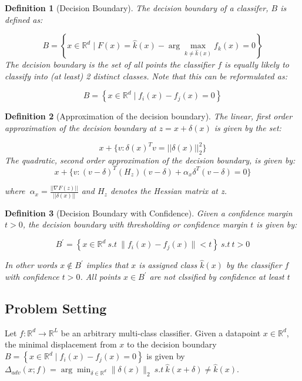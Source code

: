\documentclass[a4paper,singlecolumn,12pt]{article}
\newtheorem{definition}{Definition}[subsection]
\begin{document}
\begin{definition}[Decision Boundary]
The decision boundary of a classifer, $ B$ is defined as:

$$ B=\left\{x \in \mathbb{R}^{d} \mid F(x)=\hat{k}(x)-\arg \max _{k \neq \hat{k}(x)} f_{k}(x) = 0\right\}$$
The decision boundary is the set of all points the classifier $f$ is equally likely to classify into (at least) 2 distinct classes. Note that this can be reformulated as:

$$ B=\left\{x \in \mathbb{R}^{d} \mid f_{i}(x)-f_{j}(x)=0\right\}$$ 
\end{definition}

\begin{definition}[Approximation of the decision boundary]
The linear, first order approximation of the decision boundary at ${z}={x}+{\delta(x)}$ is given by the set:

$${x}+\{{v}:{{\delta(x)}^{T}v}=||{\delta(x)}||^2_2\}$$
The quadratic, second order approximation of the decision boundary, is given by:
$${x}+\{{v}: ({v-\delta})^{T}(H_{{z}})({v-\delta})+\alpha_{x}{\delta}^{T}({v-\delta})= 0\} $$

where $\ \alpha_x = \frac{||\nabla F({z})||}{||{\delta(x)}||}$ and $H_{z}$ denotes the Hessian matrix at z.

\end{definition}

\begin{definition}[Decision Boundary with Confidence]
Given a confidence margin $t > 0$, the decision boundary with thresholding or confidence margin $t$ is given by:

$$B^{\prime}=\left\{x \in \mathbb{R}^{d} \ s.t \ \|f_{i}(x)-f_{j}(x)\|<t\right\} \ s.t \ t > 0 $$

In other words $x \notin B^{\prime} $ implies that $x$ is assigned class $\hat{k}(x)$ by the classifier $f$ with confidence $t > 0$. All points $x \in B^{\prime}$ are not clssified by confidence at least $t$
\end{definition}



\subsection{Problem Setting}\label{problem_statement}
\par
Let $f: \mathbb{R}^{d} \rightarrow \mathbb{R}^{L}$ be an arbitrary multi-class classifier. Given a datapoint $x \in \mathbb{R}^{d}$, the minimal displacement from $x$ to the decision boundary  $B=\left\{x \in \mathbb{R}^{d} \mid f_{i}(x)-f_{j}(x)=0\right\}$ is given by $\Delta_{adv}(x;f) = \arg \min _{\delta \in \mathbb{R}^{d}} \|\delta(x)\|_{2} \ s.t \ \hat{k}(x + \delta) \neq \hat{k}(x)$.\\
\end{document}
